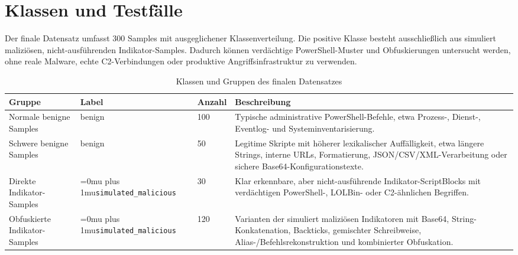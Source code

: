 \documentclass[12pt,a4paper,oneside,parskip=half]{scrreprt}
\newcommand{\codecell}[1]{\begingroup\Urlmuskip=0mu plus 1mu\relax\nolinkurl{#1}\endgroup}
\newcommand{\codebreak}[2]{\codecell{#1#2}}
\begin{document}
\section{Klassen und Testfälle}
Der finale Datensatz umfasst 300 Samples mit ausgeglichener Klassenverteilung. Die positive Klasse besteht ausschließlich aus simuliert maliziösen, nicht-ausführenden Indikator-Samples. Dadurch können verdächtige PowerShell-Muster und Obfuskierungen untersucht werden, ohne reale Malware, echte C2-Verbindungen oder produktive Angriffsinfrastruktur zu verwenden.

\begin{table}[H]
\centering
\caption{Klassen und Gruppen des finalen Datensatzes}
\small
\begin{tabularx}{\textwidth}{|L{3cm}|L{2.5cm}|C{1.5cm}|Y|}
\hline
\textbf{Gruppe} & \textbf{Label} & \textbf{Anzahl} & \textbf{Beschreibung}\\
\hline
Normale benigne Samples & benign & 100 & Typische administrative PowerShell-Befehle, etwa Prozess-, Dienst-, Eventlog- und Systeminventarisierung.\\
\hline
Schwere benigne Samples & benign & 50 & Legitime Skripte mit höherer lexikalischer Auffälligkeit, etwa längere Strings, interne URLs, Formatierung, JSON/CSV/XML-Verarbeitung oder sichere Base64-Konfigurationstexte.\\
\hline
Direkte Indikator-Samples & \codebreak{simulated}{\_malicious} & 30 & Klar erkennbare, aber nicht-ausführende Indikator-ScriptBlocks mit verdächtigen PowerShell-, LOLBin- oder C2-ähnlichen Begriffen.\\
\hline
Obfuskierte Indikator-Samples & \codebreak{simulated}{\_malicious} & 120 & Varianten der simuliert maliziösen Indikatoren mit Base64, String-Konkatenation, Backticks, gemischter Schreibweise, Alias-/Befehlsrekonstruktion und kombinierter Obfuskation.\\
\hline
\end{tabularx}
\end{table}
\end{document}
